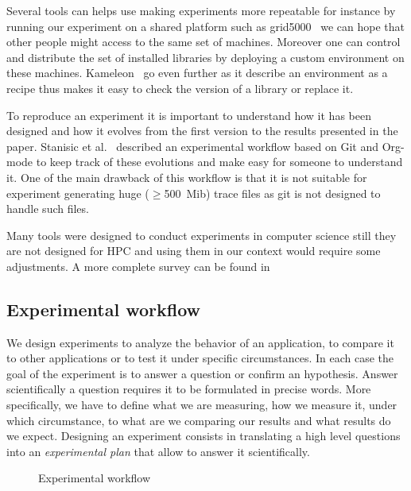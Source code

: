 Several tools can helps use making experiments more repeatable for instance by running our experiment on a shared platform such as grid5000~\cite{Cappello05Grid5000} we can hope that other people might access to the same set of machines.
Moreover one can control and distribute the set of installed libraries by deploying a custom environment on these machines.
Kameleon~\cite{Ruiz15Reconstructable} go even further as it describe an environment as a recipe thus makes it easy to check the version of a library or replace it.

To reproduce an experiment it is important to understand how it has been designed and how it evolves from the first version to the results presented in the paper.
Stanisic et al.~\cite[Chapter~4, p31-44]{Stanisic15Reproducible} described an experimental workflow based on \gls{Git} and \gls{Org-mode} to keep track of these evolutions and make easy for someone to understand it.
One of the main drawback of this workflow is that it is not suitable for experiment generating huge ($\ge$\SI{500}{Mib}) trace files as git is not designed to handle such files.

Many tools were designed to conduct experiments in computer science still they are not designed for \gls{HPC} and using them in our context would require some adjustments.
A more complete survey can be found in~\cite[Chapter~3, p17-19]{Stanisic15Reproducible}

\subsection{Experimental workflow}

We design experiments to analyze the behavior of an application, to compare it to other applications or to test it under specific circumstances.
In each case the goal of the experiment is to answer a question or confirm an hypothesis.
Answer scientifically a question requires it to be formulated in precise words.
More specifically, we have to define what we are measuring, how we measure it, under which circumstance, to what are we comparing our results and what results do we expect.
Designing an experiment consists in translating a high level questions into an \emph{experimental plan} that allow to answer it scientifically.

\begin{figure}[htb]
    \centering
    
    \caption{Experimental workflow}
    \label{fig:exp-pipeline}
\end{figure}

